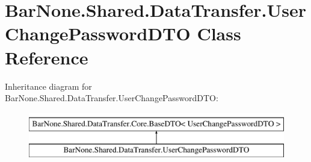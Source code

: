 \hypertarget{class_bar_none_1_1_shared_1_1_data_transfer_1_1_user_change_password_d_t_o}{}\section{Bar\+None.\+Shared.\+Data\+Transfer.\+User\+Change\+Password\+D\+TO Class Reference}
\label{class_bar_none_1_1_shared_1_1_data_transfer_1_1_user_change_password_d_t_o}


 


Inheritance diagram for Bar\+None.\+Shared.\+Data\+Transfer.\+User\+Change\+Password\+D\+TO\+:\begin{figure}[H]
\begin{center}
\leavevmode
\includegraphics[height=2.000000cm]{class_bar_none_1_1_shared_1_1_data_transfer_1_1_user_change_password_d_t_o}
\end{center}
\end{figure}

